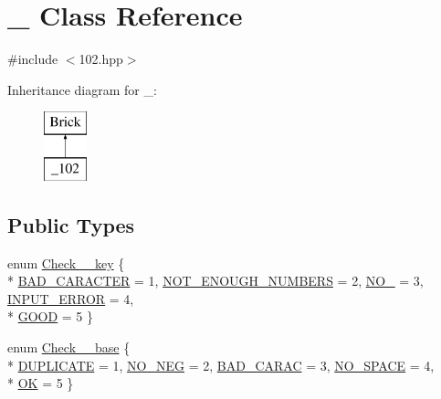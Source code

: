 \hypertarget{class__102}{}\section{\+\_ Class Reference}
\label{class__102}


{\ttfamily \#include $<$102.\+hpp$>$}

Inheritance diagram for \+\_\+:\begin{figure}[H]
\begin{center}
\leavevmode
\includegraphics[height=2.000000cm]{d0/dd1/class__102}
\end{center}
\end{figure}
\subsection*{Public Types}
\begin{DoxyCompactItemize}
\item 
enum \hyperlink{class__102_a42c689eb145f12ea5e1959bbc3c8feb9}{Check\+\_\+\_\+key} \{ \\*
\hyperlink{class__102_a42c689eb145f12ea5e1959bbc3c8feb9ab466d28554cd5d20fac2a58e6d309460}{B\+A\+D\+\_\+\+C\+A\+R\+A\+C\+T\+E\+R} = 1, 
\hyperlink{class__102_a42c689eb145f12ea5e1959bbc3c8feb9acd2e260fca6d5654797d46bc4da9c4be}{N\+O\+T\+\_\+\+E\+N\+O\+U\+G\+H\+\_\+\+N\+U\+M\+B\+E\+R\+S} = 2, 
\hyperlink{class__102_a42c689eb145f12ea5e1959bbc3c8feb9a24b75f3235979f8925775f574f37cb56}{N\+O\+\_} = 3, 
\hyperlink{class__102_a42c689eb145f12ea5e1959bbc3c8feb9aa437ed38b4947f5743309d9805eccdc9}{I\+N\+P\+U\+T\+\_\+\+E\+R\+R\+O\+R} = 4, 
\\*
\hyperlink{class__102_a42c689eb145f12ea5e1959bbc3c8feb9a28132c4dfd87b74b2cd3183838e20b88}{G\+O\+O\+D} = 5
 \}
\item 
enum \hyperlink{class__102_a4d2a75091d5c3bedfba6c129a8ed49f1}{Check\+\_\+\_\+base} \{ \\*
\hyperlink{class__102_a4d2a75091d5c3bedfba6c129a8ed49f1ac86693d7acd645a9398cd85fc08adfac}{D\+U\+P\+L\+I\+C\+A\+T\+E} = 1, 
\hyperlink{class__102_a4d2a75091d5c3bedfba6c129a8ed49f1ad6e5f99be534229e2990578c27fadd1b}{N\+O\+\_\+\+N\+E\+G} = 2, 
\hyperlink{class__102_a4d2a75091d5c3bedfba6c129a8ed49f1a5d1bc329f37dee6a2888a1a125ac1411}{B\+A\+D\+\_\+\+C\+A\+R\+A\+C} = 3, 
\hyperlink{class__102_a4d2a75091d5c3bedfba6c129a8ed49f1adb94a359ce07a3ada7bb75972ef18f35}{N\+O\+\_\+\+S\+P\+A\+C\+E} = 4, 
\\*
\hyperlink{class__102_a4d2a75091d5c3bedfba6c129a8ed49f1a33cb65cfcd7f108f863bf5db73102d0b}{O\+K} = 5
 \}
\end{DoxyCompactItemize}
